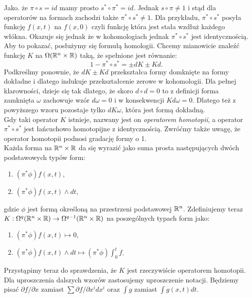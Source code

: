 \documentclass[licencjacka]{pracamgr}
\theoremstyle{definition}
\theoremstyle{definition}
\theoremstyle{plain}
\theoremstyle{plain}
\theoremstyle{plain}
\def\R{\ensuremath\mathbb{R}}
\begin{document}
Jako. że $\pi \circ s = id$  mamy prosto $s^\ast \circ \pi^\ast = id$. Jednak
$s \circ \pi \neq 1$ i stąd dla operatorów
na formach zachodzi także $\pi^\ast \circ s^\ast \neq 1$. Dla przykładu,
$\pi^\ast \circ s^\ast$ posyła funkcję $f(x, t)$ na $f(x, 0)$ czyli 
funkcję która jest stała wzdłuż każdego włókna. Okazuje się jednak
że w kohomologiach jednak $\pi^\ast \circ s^\ast$ jest identycznością.
Aby to pokazać, posłużymy się formułą homologii. Chcemy mianowicie
znaleźć funkcję $K$ na $\Omega(\R^n \times \R)$ taką, że spełnione jest
równanie:
\[
    1 - \pi^\ast \circ s^\ast = \pm dK \pm Kd.
\]
Podkreślmy ponownie, że $dK \pm Kd$ przekształca formy domknięte
na formy dokładne i dlatego indukuje przekształcenie zerowe w kohomologii. 
Dla pełnej klarowności, dzieje się tak dlatego, że skoro $d \circ d = 0$
to z definicji forma zamknięta $\omega$ zachowuje wzór $d \omega = 0$ i
w konsekwencji $K d \omega = 0$. Dlatego też z powyższego wzoru pozostaje
tylko $d K \omega$, która jest formą dokładną. \\

Gdy taki operator $K$ istnieje, nazwany jest on \emph{operatorem homotopii},
a operator $\pi^\ast \circ s^\ast$ jest łańcuchowo homotopijne z identycznością.
Zwróćmy także uwagę, że operator homotopii podnosi gradację formy o 1. \\

Każda forma na $\R^n \times \R$ da się wyrazić jako suma prosta następujących
dwóch podstawowych typów form:

\begin{enumerate}
    \item $(\pi^\ast \phi)f(x,t)$, 
    \item $(\pi^\ast \phi)f(x,t) \wedge dt$,
\end{enumerate}

gdzie $\phi$ jest formą określoną na przestrzeni podstawowej $\R^n$.
Zdefiniujemy teraz
$K: \Omega^{q} (\R^n \times \R) \rightarrow \Omega^{q-1} (\R^n \times \R)$ 
na poszególnych typach form jako:
\begin{enumerate}
    \item $(\pi^\ast \phi)f(x,t) \mapsto 0$,
    \item $(\pi^\ast \phi)f(x,t) \wedge dt \mapsto (\pi^\ast \phi) \int_0^t f$.
\end{enumerate}
Przystąpimy teraz do sprawdzenia, że $K$ jest rzeczywiście operatorem homotopii.
Dla uproszczenia dalszych wzorów zastosujemy uproszczenie notacji. Będziemy
pisać $\partial f / \partial x$ zamiast $\sum \partial f / \partial x^i dx^i$
oraz $\int g$ zamiast $\int g(x, t) dt$. \\
\end{document}
